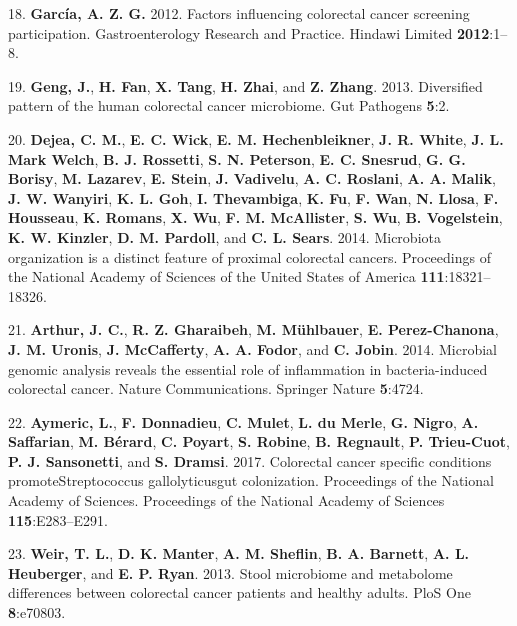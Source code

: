 \documentclass[12pt,]{article}
\begin{document}
\hypertarget{ref-GimenoGarca2012}{}
18. \textbf{García, A. Z. G.} 2012. Factors influencing colorectal
cancer screening participation. Gastroenterology Research and Practice.
Hindawi Limited \textbf{2012}:1--8.

\hypertarget{ref-geng_diversified_2013}{}
19. \textbf{Geng, J.}, \textbf{H. Fan}, \textbf{X. Tang}, \textbf{H.
Zhai}, and \textbf{Z. Zhang}. 2013. Diversified pattern of the human
colorectal cancer microbiome. Gut Pathogens \textbf{5}:2.

\hypertarget{ref-dejea_microbiota_2014}{}
20. \textbf{Dejea, C. M.}, \textbf{E. C. Wick}, \textbf{E. M.
Hechenbleikner}, \textbf{J. R. White}, \textbf{J. L. Mark Welch},
\textbf{B. J. Rossetti}, \textbf{S. N. Peterson}, \textbf{E. C.
Snesrud}, \textbf{G. G. Borisy}, \textbf{M. Lazarev}, \textbf{E. Stein},
\textbf{J. Vadivelu}, \textbf{A. C. Roslani}, \textbf{A. A. Malik},
\textbf{J. W. Wanyiri}, \textbf{K. L. Goh}, \textbf{I. Thevambiga},
\textbf{K. Fu}, \textbf{F. Wan}, \textbf{N. Llosa}, \textbf{F.
Housseau}, \textbf{K. Romans}, \textbf{X. Wu}, \textbf{F. M.
McAllister}, \textbf{S. Wu}, \textbf{B. Vogelstein}, \textbf{K. W.
Kinzler}, \textbf{D. M. Pardoll}, and \textbf{C. L. Sears}. 2014.
Microbiota organization is a distinct feature of proximal colorectal
cancers. Proceedings of the National Academy of Sciences of the United
States of America \textbf{111}:18321--18326.

\hypertarget{ref-ecoli_Arthur_2014}{}
21. \textbf{Arthur, J. C.}, \textbf{R. Z. Gharaibeh}, \textbf{M.
Mühlbauer}, \textbf{E. Perez-Chanona}, \textbf{J. M. Uronis}, \textbf{J.
McCafferty}, \textbf{A. A. Fodor}, and \textbf{C. Jobin}. 2014.
Microbial genomic analysis reveals the essential role of inflammation in
bacteria-induced colorectal cancer. Nature Communications. Springer
Nature \textbf{5}:4724.

\hypertarget{ref-strep_Aymeric_2017}{}
22. \textbf{Aymeric, L.}, \textbf{F. Donnadieu}, \textbf{C. Mulet},
\textbf{L. du Merle}, \textbf{G. Nigro}, \textbf{A. Saffarian},
\textbf{M. Bérard}, \textbf{C. Poyart}, \textbf{S. Robine}, \textbf{B.
Regnault}, \textbf{P. Trieu-Cuot}, \textbf{P. J. Sansonetti}, and
\textbf{S. Dramsi}. 2017. Colorectal cancer specific conditions
promoteStreptococcus gallolyticusgut colonization. Proceedings of the
National Academy of Sciences. Proceedings of the National Academy of
Sciences \textbf{115}:E283--E291.

\hypertarget{ref-weir_stool_2013}{}
23. \textbf{Weir, T. L.}, \textbf{D. K. Manter}, \textbf{A. M. Sheflin},
\textbf{B. A. Barnett}, \textbf{A. L. Heuberger}, and \textbf{E. P.
Ryan}. 2013. Stool microbiome and metabolome differences between
colorectal cancer patients and healthy adults. PloS One
\textbf{8}:e70803.
\end{document}
